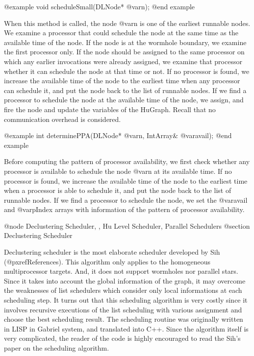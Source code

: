 @example
void scheduleSmall(DLNode* @var{n});
@end example

When this method is called, the node @var{n} is one of the earliest
runnable nodes. We examine a processor that could schedule the node
at the same time as the available time of the node. If the node
is at the wormhole boundary, we examine the first processor only. If
the node should be assigned to the same processor on which any earlier
invocations were already assigned, we examine that processor whether
it can schedule the node at that time or not. If no processor is found,
we increase the available time of the node to the earliest time when
any processor can schedule it, and put the node back to the list of
runnable nodes. If we find a processor to schedule the node at
the available time of the node, we assign, and fire the node and
update the variables of the HuGraph. Recall that no communication
overhead is considered.

@example
int determinePPA(DLNode* @var{n}, IntArray& @var{avail});
@end example

Before computing the pattern of processor availability, we first check
whether any processor is available to schedule the node @var{n} at its
available time. If no processor is found, we increase the available time
of the node to the earliest time when a processor is able to schedule it,
and put the node back to the list of runnable nodes.
If we find a processor to schedule the node, we set the @var{avail} and
@var{pIndex} arrays with information of the pattern of processor availability.

@node Declustering Scheduler, , Hu Level Scheduler, Parallel Schedulers
@section Declustering Scheduler

Declustering scheduler is the most elaborate scheduler developed by Sih
(@pxref{References}). This algorithm only applies to the homogeneous
multiprocessor targets. And, it does not support wormholes 
nor parallel stars. Since it takes into account the global information
of the graph, it may overcome the weaknesses of list schedulers which
consider only local informations at each scheduling step. It turns out
that this scheduling algorithm is very costly since it involves
recursive executions of the list scheduling with various assignment
and choose the best scheduling result. The scheduling routine was
originally written in LISP in Gabriel system, and translated into
C++. Since the algorithm itself is very complicated, the reader of the code
is highly encouraged to read the Sih's paper on the scheduling algorithm.

